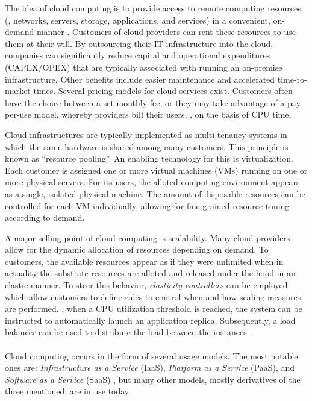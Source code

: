 The idea of cloud computing is to provide access to remote computing resources  (\eg , networks, servers, storage, applications, and services) in a convenient, on-demand manner \cite{mell2011nist}. Customers of cloud providers can rent these resources to use them at their will. By outsourcing their IT infrastructure into the cloud, companies can significantly reduce capital and operational expenditures (CAPEX/OPEX) that are typically associated with running an on-premise infrastructure. Other benefits include easier maintenance and accelerated time-to-market times. Several pricing models for cloud services exist. Customers often have the choice between a set monthly fee, or they may take advantage of a pay-per-use model, whereby providers bill their users, \eg , on the basis of CPU time.

Cloud infrastructures are typically implemented as multi-tenancy systems in which the same hardware is shared among many customers. This principle is known as ``resource pooling''. An enabling technology for this is virtualization. Each customer is assigned one or more virtual machines (VMs) running on one or more physical servers. For its users, the alloted computing environment appears as a single, isolated physical machine. The amount of disposable resources can be controlled for each VM individually, allowing for fine-grained resource tuning according to demand.

A major selling point of cloud computing is scalability. Many cloud providers allow for the dynamic allocation of resources depending on demand. To customers, the available resources appear as if they were unlimited when in actuality the substrate resources are alloted and released under the hood in an elastic manner. To steer this behavior, \emph{elasticity controllers} can be employed which allow customers to define rules to control when and how scaling measures are performed. \Eg , when a CPU utilization threshold is reached, the system can be instructed to automatically launch an application replica. Subsequently, a load balancer can be used to distribute the load between the instances \cite{vaquero2011dynamically}.


\paragraph{}
Cloud computing occurs in the form of several usage models. The most notable ones are: \emph{Infrastructure as a Service} (IaaS),  \emph{Platform as a Service} (PaaS), and \emph{Software as a Service} (SaaS) \cite{mell2011nist}, but many other models, mostly derivatives of the three mentioned, are in use today.

